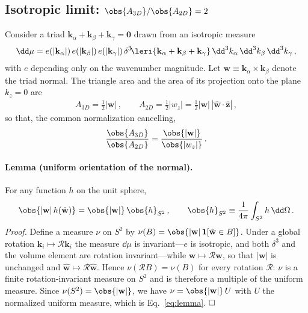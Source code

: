 \subsection{Isotropic limit: $\obs{A_{3D}}/\obs{A_{2D}}=2$}

Consider a triad $\mathbf{k}_\alpha+\mathbf{k}_\beta+\mathbf{k}_\gamma=\mathbf{0}$ drawn from an
isotropic measure
\begin{align}
    \dd\mu = e(|\mathbf{k}_\alpha|)\,e(|\mathbf{k}_\beta|)\,e(|\mathbf{k}_\gamma|)\,
    \delta^3\!\leri{\mathbf{k}_\alpha+\mathbf{k}_\beta+\mathbf{k}_\gamma}\,
    \dd^3k_\alpha\,\dd^3k_\beta\,\dd^3k_\gamma\,,
\end{align}
with $e$ depending only on the wavenumber magnitude. Let $\mathbf{w}\equiv\mathbf{k}_\alpha\times\mathbf{k}_\beta$ denote the triad normal. The triangle area and the area of its projection onto the plane $k_z=0$ are
\begin{align}
    A_{3D}=\tfrac12|\mathbf{w}|\,,\qquad
    A_{2D}=\tfrac12|w_z|=\tfrac12|\mathbf{w}|\,|\hat{\mathbf{w}}\cdot\hat{\mathbf z}|\,,
\end{align}
so that, the common normalization cancelling,
\begin{align}\label{eq:iso-ratio-w}
    \frac{\obs{A_{3D}}}{\obs{A_{2D}}}=\frac{\obs{|\mathbf{w}|}}{\obs{|w_z|}}\,.
\end{align}

\paragraph{Lemma (uniform orientation of the normal).}
For any function $h$ on the unit sphere,
\begin{align}\label{eq:lemma}
    \obs{|\mathbf{w}|\,h(\hat{\mathbf{w}})} = \obs{|\mathbf{w}|}\,\obs{h}_{S^2}\,,
    \qquad \obs{h}_{S^2}\equiv\frac{1}{4\pi}\int_{S^2} h\,\dd\Omega\,.
\end{align}
\emph{Proof.} Define a measure $\nu$ on $S^2$ by $\nu(B)=\obs{|\mathbf{w}|\,\mathbf{1}[\hat{\mathbf{w}}\in B]}$. Under a global rotation $\mathbf{k}_i\mapsto\mathcal{R}\mathbf{k}_i$ the measure $\dd\mu$ is invariant---$e$ is isotropic, and both $\delta^3$ and the volume element are rotation invariant---while $\mathbf{w}\mapsto\mathcal{R}\mathbf{w}$, so that $|\mathbf{w}|$ is unchanged and $\hat{\mathbf{w}}\mapsto\mathcal{R}\hat{\mathbf{w}}$. Hence $\nu(\mathcal{R}B)=\nu(B)$ for every rotation $\mathcal{R}$: $\nu$ is a finite rotation-invariant measure on $S^2$ and is therefore a multiple of the uniform measure. Since $\nu(S^2)=\obs{|\mathbf{w}|}$, we have $\nu=\obs{|\mathbf{w}|}\,U$ with $U$ the normalized uniform measure, which is Eq.~\eqref{eq:lemma}. $\hfill\square$


